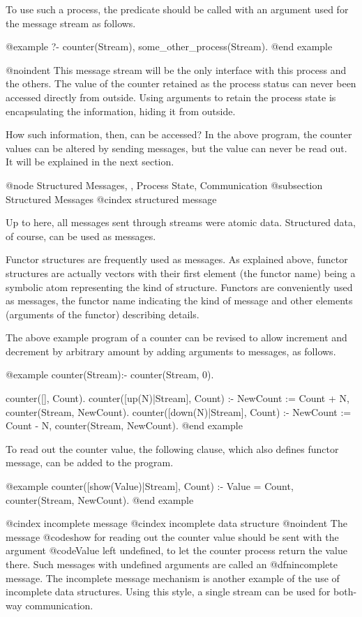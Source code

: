 {To use such a process, the predicate should be called with an argument
used for the message stream as follows.

@example
?- counter(Stream), some_other_process(Stream).
@end example

@noindent
This message stream will be the only interface with this process and the
others.  The value of the counter retained as the process status can
never been accessed directly from outside.  Using arguments to retain
the process state is encapsulating the information, hiding it from
outside.

How such information, then, can be accessed?  In the above program,
the counter values can be altered by sending messages, but the value
can never be read out.  It will be explained in the next section.

@node Structured Messages,  , Process State, Communication
@subsection Structured Messages
@cindex structured message

Up to here, all messages sent through streams were atomic data.
Structured data, of course, can be used as messages.

Functor structures are frequently used as messages.  As explained above,
functor structures are actually vectors with their first element (the
functor name) being a symbolic atom representing the kind of structure.
Functors are conveniently used as messages, the functor name indicating
the kind of message and other elements (arguments of the functor)
describing details.

The above example program of a counter can be revised to allow increment
and decrement by arbitrary amount by adding arguments to messages, as
follows.

@example
counter(Stream):- counter(Stream, 0).

counter([], Count).
counter([up(N)|Stream], Count) :-
    NewCount := Count + N,
    counter(Stream, NewCount).
counter([down(N)|Stream], Count) :-
    NewCount := Count - N,
    counter(Stream, NewCount).
@end example

To read out the counter value, the following clause, which also
defines functor message, can be added to the program.

@example
counter([show(Value)|Stream], Count) :-
    Value = Count,
    counter(Stream, NewCount).
@end example

@cindex incomplete message
@cindex incomplete data structure
@noindent
The message @code{show} for reading out the counter value should be sent
with the argument @code{Value} left undefined, to let the counter
process return the value there.  Such messages with undefined arguments
are called an @dfn{incomplete message}.  The incomplete message
mechanism is another example of the use of incomplete data structures.
Using this style, a single stream can be used for both-way
communication.

}
